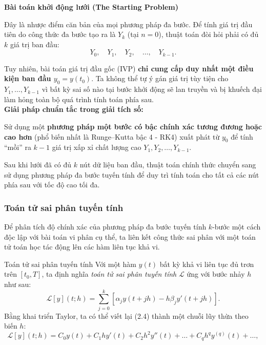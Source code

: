 \noindent\textbf{Bài toán khởi động lưới (The Starting Problem)}
    
Đây là nhược điểm căn bản của mọi phương pháp đa bước. Để tính giá trị đầu tiên do công thức đa bước tạo ra là $Y_k$ (tại $n=0$), thuật toán đòi hỏi phải có đủ $k$ giá trị ban đầu:
\[
    Y_0, \quad Y_1, \quad Y_2, \quad \dots, \quad Y_{k-1}.
\]

Tuy nhiên, bài toán giá trị đầu gốc (IVP) \textbf{chỉ cung cấp duy nhất một điều kiện ban đầu $y_0 = y(t_0)$}. Ta không thể tự ý gán giá trị tùy tiện cho $Y_1, \dots, Y_{k-1}$ vì bất kỳ sai số nào tại bước khởi động sẽ lan truyền và bị khuếch đại làm hỏng toàn bộ quá trình tính toán phía sau.\\

\noindent\textbf{Giải pháp chuẩn tắc trong giải tích số:}

Sử dụng một \textbf{phương pháp một bước có bậc chính xác tương đương hoặc cao hơn} (phổ biến nhất là Runge--Kutta bậc 4 - RK4) xuất phát từ $y_0$ để tính ``mồi'' ra $k-1$ giá trị xấp xỉ chất lượng cao $Y_1, Y_2, \dots, Y_{k-1}$.

Sau khi lưới đã có đủ $k$ nút dữ liệu ban đầu, thuật toán chính thức chuyển sang sử dụng phương pháp đa bước tuyến tính để duy trì tính toán cho tất cả các nút phía sau với tốc độ cao tối đa.


\subsubsection{Toán tử sai phân tuyến tính}

Để phân tích độ chính xác của phương pháp đa bước tuyến tính $k$-bước một cách độc lập với bài toán vi phân cụ thể, ta liên kết công thức sai phân với một toán tử toán học tác động lên các hàm liên tục khả vi.

\begin{baitapbox}{Toán tử sai phân tuyến tính}
    Với một hàm $y(t)$ bất kỳ khả vi liên tục đủ trơn trên $[t_0, T]$, ta định nghĩa \textit{toán tử sai phân tuyến tính} $\mathcal{L}$ ứng với bước nhảy $h$ như sau:
\begin{equation}
    \mathcal{L}[y](t; h) = \sum_{j=0}^{k} \left[ \alpha_j y(t + jh) - h \beta_j y'(t + jh) \right]. \tag{2.6} \label{eq:2.6}
\end{equation}
    Bằng khai triển Taylor, ta có thể viết lại (2.4) thành một chuỗi lũy thừa theo biến $h$:
\begin{equation}
    \mathcal{L}[y](t; h) = C_0 y(t) + C_1 h y'(t) + C_2 h^2 y''(t) + \dots + C_q h^q y^{(q)}(t) + \dots, \tag{2.7} \label{eq:2.7}
\end{equation}
\end{baitapbox}

